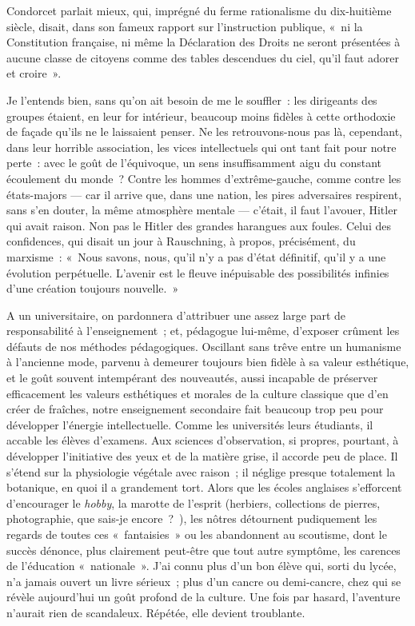 \documentclass[french,twoside]{book} %
\begin{document}
Condorcet parlait mieux, qui, imprégné du ferme rationalisme du dix-huitième siècle, disait, dans son fameux rapport sur l’instruction publique, « ni la Constitution française, ni même la Déclaration des Droits ne seront présentées à aucune classe de   citoyens comme des tables descendues du ciel, qu’il faut adorer et croire ».\par
Je l’entends bien, sans qu’on ait besoin de me le souffler : les dirigeants des groupes étaient, en leur for intérieur, beaucoup moins fidèles à cette orthodoxie de façade qu’ils ne le laissaient penser. Ne les retrouvons-nous pas là, cependant, dans leur horrible association, les vices intellectuels qui ont tant fait pour notre perte : avec le goût de l’équivoque, un sens insuffisamment aigu du constant écoulement du monde ? Contre les hommes d’extrême-gauche, comme contre les états-majors — car il arrive que, dans une nation, les pires adversaires respirent, sans s’en douter, la même atmosphère mentale — c’était, il faut l’avouer, Hitler qui avait raison. Non pas le Hitler des grandes harangues aux foules. Celui des confidences, qui disait un jour à Rauschning, à propos, précisément, du marxisme : « Nous savons, nous, qu’il n’y a pas d’état définitif, qu’il y a une évolution perpétuelle. L’avenir est le fleuve inépuisable des possibilités infinies d’une création toujours nouvelle. »\par
A un universitaire, on pardonnera d’attribuer une assez large part de responsabilité à l’enseignement ; et, pédagogue lui-même, d’exposer crûment les défauts de nos méthodes pédagogiques. Oscillant sans trêve entre un humanisme à l’ancienne mode, parvenu à demeurer toujours bien fidèle à sa valeur esthétique, et le goût souvent intempérant des nouveautés, aussi incapable de préserver efficacement les valeurs esthétiques et morales de la culture classique que d’en créer de fraîches, notre enseignement secondaire fait beaucoup trop peu pour développer l’énergie intellectuelle. Comme les universités leurs étudiants, il accable les élèves d’examens. Aux sciences d’observation, si propres, pourtant, à développer l’initiative des yeux et de la matière grise, il accorde peu de place. Il s’étend sur la physiologie végétale avec raison ; il néglige presque totalement la   botanique, en quoi il a grandement tort. Alors que les écoles anglaises s’efforcent d’encourager le \emph{hobby}, la marotte de l’esprit (herbiers, collections de pierres, photographie, que sais-je encore ? ), les nôtres détournent pudiquement les regards de toutes ces « fantaisies » ou les abandonnent au scoutisme, dont le succès dénonce, plus clairement peut-être que tout autre symptôme, les carences de l’éducation « nationale ». J’ai connu plus d’un bon élève qui, sorti du lycée, n’a jamais ouvert un livre sérieux ; plus d’un cancre ou demi-cancre, chez qui se révèle aujourd’hui un goût profond de la culture. Une fois par hasard, l’aventure n’aurait rien de scandaleux. Répétée, elle devient troublante.\par
\end{document}
